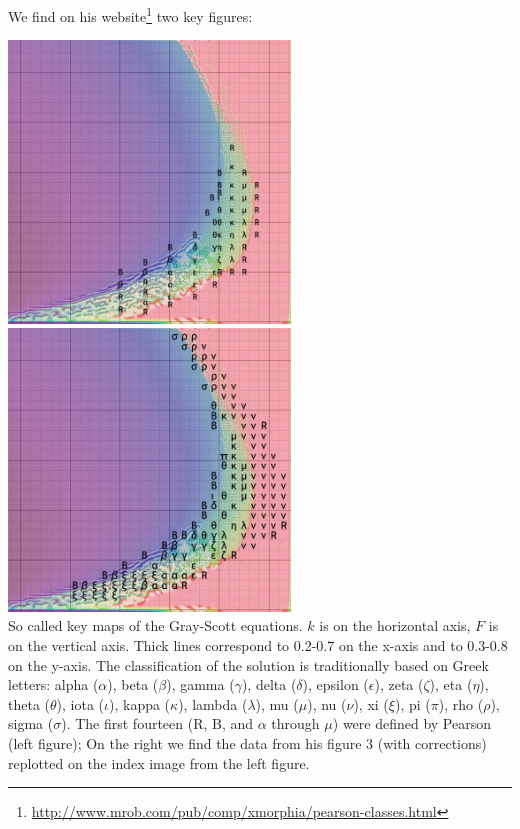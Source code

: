 We find on his website\footnote{\url{http://www.mrob.com/pub/comp/xmorphia/pearson-classes.html}}
two key figures:

\begin{center}
\includegraphics[height=7.5cm]{python_codes/fieldstone_171/images/pearson-orig}
\includegraphics[height=7.5cm]{python_codes/fieldstone_171/images/pearson-tags}\\
{\captionfont So called key maps of the Gray-Scott equations. $k$ is on the 
horizontal axis, $F$ is on the vertical axis. Thick lines correspond to 
0.2-0.7 on the x-axis and to 0.3-0.8 on the y-axis.
The classification of the solution is traditionally based on Greek letters:
alpha ($\alpha$),    beta ($\beta$),    gamma ($\gamma$),    delta ($\delta$),    
epsilon ($\epsilon$),    zeta ($\zeta$),    eta ($\eta$),    
theta ($\theta$),    iota ($\iota$),    kappa ($\kappa$),    lambda ($\lambda$),    
mu ($\mu$),    nu ($\nu$),    xi ($\xi$),    pi ($\pi$),    rho ($\rho$),    sigma ($\sigma$).
The first fourteen
(R, B, and $\alpha$ through $\mu$) were defined by Pearson \cite{pear93} (left figure); 
On the right we find the data from his figure 3 (with corrections) replotted on the index image from the left figure. 
}
\end{center}

